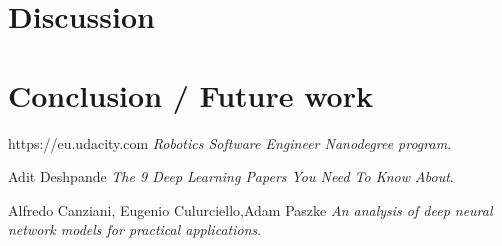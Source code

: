\documentclass[10pt,journal,compsoc]{IEEEtran}
\begin{document}
\section{Discussion}
\section{Conclusion / Future work}

\begin{thebibliography}{9}


https://eu.udacity.com
\textit{Robotics Software Engineer Nanodegree program}. 

Adit Deshpande
\textit{The 9 Deep Learning Papers You Need To Know About}. 

Alfredo Canziani, Eugenio Culurciello,Adam Paszke  
\textit{An analysis of deep neural network models for practical applications}. 
\end{thebibliography}
\end{document}

